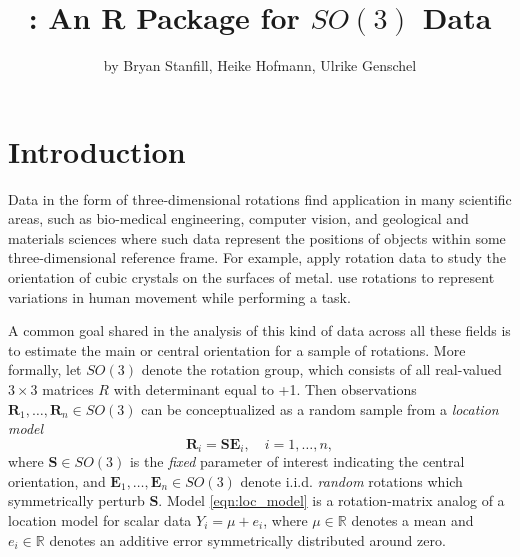 \title{: An R Package for $SO(3)$ Data}
\author{by Bryan Stanfill, Heike Hofmann, Ulrike Genschel}

\maketitle


\section{Introduction}

Data in the form of three-dimensional rotations find application in many scientific areas, such as bio-medical engineering, computer vision, and geological and materials sciences where such data represent the positions of objects within some three-dimensional reference frame.  For example, \cite{humbert1996, bingham2009, bachmann2010} apply rotation data to study the orientation of cubic crystals on the surfaces of metal.  \cite{rancourt2000} use rotations to represent  variations in human movement while performing a task. 

A common goal shared in the analysis of this kind of data across all these fields is to estimate the main or central orientation for a sample of rotations. 
More formally, let  $SO(3)$ denote the  rotation group, which consists of all real-valued $3\times 3$  matrices $R$ with determinant equal to +1.
Then observations $\bm{R}_1,\ldots,\bm{R}_n \in SO(3)$ can be conceptualized as a random sample from a \textit{location model}
\begin{equation}
\label{eqn:loc_model}
\mathbf{R}_i = \bm{S} \bm{E}_i, \quad i=1,\ldots,n,
\end{equation}
where $\bm S \in SO(3)$ is the {\it fixed} parameter of interest indicating the central orientation, and $\bm{E}_1,\ldots,\bm{E}_n \in SO(3)$ denote i.i.d. {\it random} rotations which symmetrically perturb $\bm{S}$.  Model \eqref{eqn:loc_model} is a rotation-matrix analog of a location model for scalar data $Y_i = \mu + e_i$, where $\mu \in \mathbb{R}$ denotes a mean and $e_i \in \mathbb{R}$ denotes an additive error symmetrically distributed around zero.

